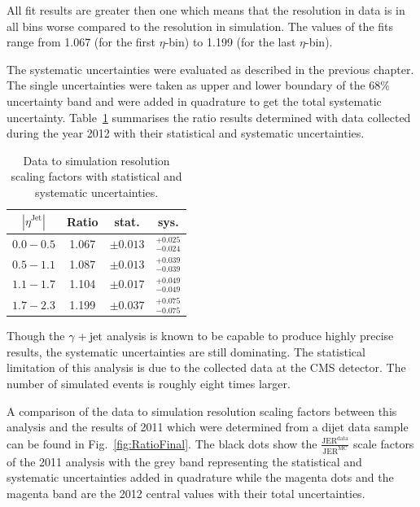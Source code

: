 All fit results are greater then one which means that the resolution in data is in all bins worse compared to the resolution in simulation.
The values of the fits range from 1.067 (for the first $\eta$-bin) to 1.199 (for the last $\eta$-bin). 

The systematic uncertainties were evaluated as described in the previous chapter. 
The single uncertainties were taken as upper and lower boundary of the 68\% uncertainty band and were added in quadrature to get the total systematic uncertainty.
\mbox{Table \ref{tab:FinalResults}} summarises the ratio results determined with data collected during the year 2012 with their statistical and systematic uncertainties.

\begin{table}[t]
\caption{Data to simulation resolution scaling factors with statistical and systematic uncertainties.}\renewcommand{\arraystretch}{2.0}
\large{
\begin{center}
\begin{tabular}{ | c | c   c c| }
$|\eta^{\text{Jet}}|$ & Ratio &  stat.      & sys.  \\\hline
$0.0 - 0.5$ &1.067 & $\pm 0.013$ & $^{+0.025}_{-0.024}$ \\
$0.5 - 1.1$ &1.087 & $\pm 0.013$ & $^{+0.039}_{-0.039}$ \\
$1.1 - 1.7$ &1.104 & $\pm 0.017$ & $^{+0.049}_{-0.049}$ \\
$1.7 - 2.3$ &1.199 & $\pm 0.037$ & $^{+0.075}_{-0.075}$ \\
\hline
\end{tabular}
\end{center}
}
\label{tab:FinalResults}
\end{table}

Though the $\gamma + \text{jet}$ analysis is known to be capable to produce highly precise results, the systematic uncertainties are still dominating. 
The statistical limitation of this analysis is due to the collected data at the CMS detector. 
The number of simulated events is roughly eight times larger.
 
A comparison of the data to simulation resolution scaling factors between this analysis and the results of 2011 which were determined from a dijet data sample
\cite{Schroder:2012} can be found in \mbox{Fig. \ref{fig:RatioFinal}}.
The black dots show the $\frac{\text{JER}^{\text{data}}}{\text{JER}^{\text{MC}}}$ scale factors of the 2011 analysis with the grey band 
representing the statistical and systematic uncertainties added in quadrature while the magenta dots and the magenta band
are the 2012 central values with their total uncertainties.

